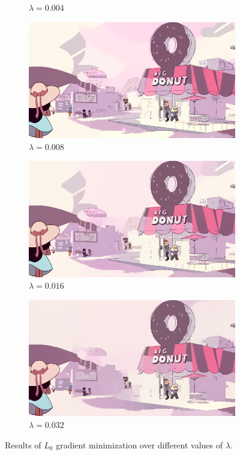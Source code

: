 \documentclass[10pt,twocolumn,letterpaper]{article}
\begin{document}
\begin{figure}
\begin{subfigure}{.48\linewidth}
\caption{$\lambda = 0.004$}
\end{subfigure}
\begin{subfigure}{.48\linewidth}
\includegraphics[width=\linewidth]{gradminResults/gradmin_8.png}
\caption{$\lambda = 0.008$}
\end{subfigure}
\begin{subfigure}{.48\linewidth}
\includegraphics[width=\linewidth]{gradminResults/gradmin_16.png}
\caption{$\lambda = 0.016$}
\end{subfigure}
\begin{subfigure}{.48\linewidth}
\includegraphics[width=\linewidth]{gradminResults/gradmin_32.png}
\caption{$\lambda = 0.032$}
\end{subfigure}
\caption{Results of $L_0$ gradient minimization over different values of $\lambda$.}
\label{fig:gradminResultsFull}
\end{figure}
\end{document}

